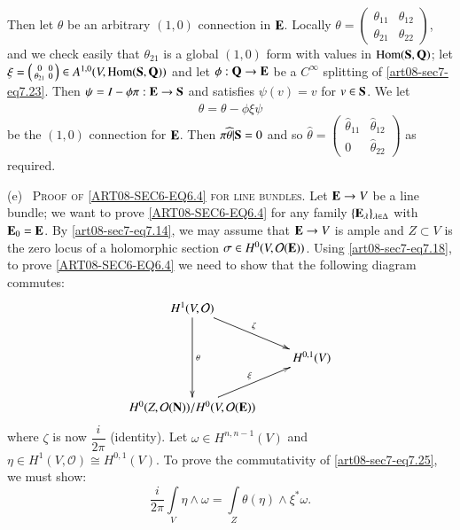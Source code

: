 Then let $\theta$ be an arbitrary $(1,0)$ connection in $\mathbf{E}$. Locally $\theta=\left(\begin{smallmatrix} \theta_{11} & \theta_{12}\\ \theta_{21} & \theta_{22}\end{smallmatrix}\right)$, and we check easily that $\theta_{21}$ is a global $(1,0)$ form with values in $\operatorname{\mathrm{Hom}}(\mathbf{S},\mathbf{Q})$; let $\xi=\left(\begin{smallmatrix} 0 & 0\\ \theta_{21} & 0\end{smallmatrix}\right)\in A^{1,0}(V,\operatorname{\mathrm{Hom}}(\mathbf{S},\mathbf{Q}))$ and let $\phi:\mathbf{Q}\to \mathbf{E}$ be a $C^{\infty}$ splitting of \eqref{art08-sec7-eq7.23}. Then $\psi=I-\phi\pi:\mathbf{E}\to \mathbf{S}$ and satisfies $\psi(v)=v$ for $v\in \mathbf{S}$. We let
\begin{equation}
\widehat{\theta}=\theta-\phi\xi\psi\label{art08-sec7-eq7.24}
\end{equation}
be the $(1,0)$ connection for $\mathbf{E}$. Then $\pi\widehat{\theta}|\mathbf{S}=0$ and so $\widehat{\theta}=\left(\begin{smallmatrix} \widehat{\theta}_{11} & \widehat{\theta}_{12}\\ 0 & \widehat{\theta}_{22}\end{smallmatrix}\right)$ as required.

(e)~ \textsc{Proof of \eqref{ART08-SEC6-EQ6.4} for line bundles.} Let $\mathbf{E}\to V$ be a line bundle; we want to prove \eqref{ART08-SEC6-EQ6.4} for any family $\{\mathbf{E}_{\lambda}\}_{\lambda\in \Delta}$ with $\mathbf{E}_{0}=\mathbf{E}$. By \eqref{art08-sec7-eq7.14}, we may assume that $\mathbf{E}\to V$ is ample and $Z\subset V$ is the zero locus of a holomorphic section $\sigma\in H^{0}(V,\mathcal{O}(\mathbf{E}))$. Using \eqref{art08-sec7-eq7.18}, to prove \eqref{ART08-SEC6-EQ6.4} we need to show that the following diagram commutes:
\begin{equation}
\vcenter{\xymatrix{
H^{1}(V,\mathcal{O})\ar[dd]^-{\theta}\ar[dr]^-{\zeta} & \\
            & H^{0,1}(V)\\
H^{0}(Z,\mathcal{O}(\bfN))/H^{0}(V,\mathcal{O}(\bfE))\ar[ur]^{\xi} &
}}\label{art08-sec7-eq7.25}
\end{equation}
where $\zeta$ is now $\dfrac{i}{2\pi}$ (identity). Let $\omega\in H^{n,n-1}(V)$ and $\eta\in H^{1}(V,\mathcal{O})\cong H^{0,1}(V)$. To prove the commutativity of \eqref{art08-sec7-eq7.25}, we must show:
\begin{equation}
\frac{i}{2\pi}\int\limits_{V}\eta\wedge\omega=\int\limits_{Z}\theta(\eta)\wedge \xi^{*}\omega.\label{art08-sec7-eq7.26}
\end{equation}

